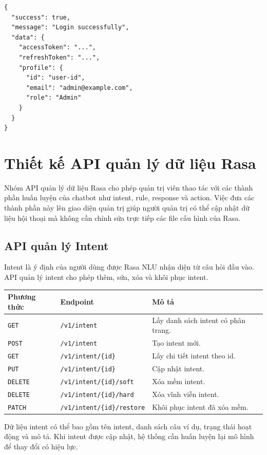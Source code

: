 \begin{verbatim}
{
  "success": true,
  "message": "Login successfully",
  "data": {
    "accessToken": "...",
    "refreshToken": "...",
    "profile": {
      "id": "user-id",
      "email": "admin@example.com",
      "role": "Admin"
    }
  }
}
\end{verbatim}

\section{Thiết kế API quản lý dữ liệu Rasa}

Nhóm API quản lý dữ liệu Rasa cho phép quản trị viên thao tác với các thành phần huấn luyện của chatbot như intent, rule, response và action. Việc đưa các thành phần này lên giao diện quản trị giúp người quản trị có thể cập nhật dữ liệu hội thoại mà không cần chỉnh sửa trực tiếp các file cấu hình của Rasa.

\subsection{API quản lý Intent}

Intent là ý định của người dùng được Rasa NLU nhận diện từ câu hỏi đầu vào. API quản lý intent cho phép thêm, sửa, xóa và khôi phục intent.

\begin{longtable}{|p{3cm}|p{5cm}|p{7cm}|}
\hline
\textbf{Phương thức} & \textbf{Endpoint} & \textbf{Mô tả} \\
\hline
\texttt{GET} & \texttt{/v1/intent} & Lấy danh sách intent có phân trang. \\
\hline
\texttt{POST} & \texttt{/v1/intent} & Tạo intent mới. \\
\hline
\texttt{GET} & \texttt{/v1/intent/\{id\}} & Lấy chi tiết intent theo id. \\
\hline
\texttt{PUT} & \texttt{/v1/intent/\{id\}} & Cập nhật intent. \\
\hline
\texttt{DELETE} & \texttt{/v1/intent/\{id\}/soft} & Xóa mềm intent. \\
\hline
\texttt{DELETE} & \texttt{/v1/intent/\{id\}/hard} & Xóa vĩnh viễn intent. \\
\hline
\texttt{PATCH} & \texttt{/v1/intent/\{id\}/restore} & Khôi phục intent đã xóa mềm. \\
\hline
\end{longtable}

Dữ liệu intent có thể bao gồm tên intent, danh sách câu ví dụ, trạng thái hoạt động và mô tả. Khi intent được cập nhật, hệ thống cần huấn luyện lại mô hình để thay đổi có hiệu lực.

